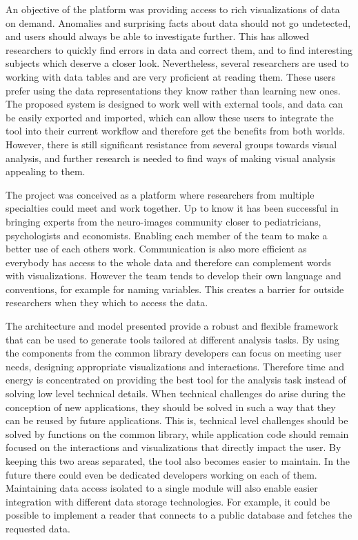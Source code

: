 An objective of the platform was providing access to rich visualizations of data on demand. Anomalies and surprising facts about data should not go undetected, and users should always be able to investigate further. This has allowed researchers to quickly find errors in data and correct them, and to find interesting subjects which deserve a closer look. Nevertheless, several researchers are used to working with data tables and are very proficient at reading them. These users prefer using the data representations they know rather than learning new ones. The proposed system is designed to work well with external tools, and data can be easily exported and imported, which can allow these users to integrate the tool into their current workflow and therefore get the benefits from both worlds. However, there is still significant resistance from several groups towards visual analysis, and further research is needed to find ways of making visual analysis appealing to them. 

The project was conceived as a platform where researchers from multiple specialties could meet and work together. Up to know it has been successful in bringing experts from the neuro-images community closer to pediatricians, psychologists and economists. Enabling each member of the team to make a better use of each others work. Communication is also more efficient as everybody has access to the whole data and therefore can complement words with visualizations. However the team tends to develop their own language and conventions, for example for naming variables. This creates a barrier for outside researchers when they which to access the data. 

The architecture and model presented provide a robust and flexible framework that can be used to generate tools tailored at different analysis tasks. By using the components from the common library developers can focus on meeting user needs, designing appropriate visualizations and interactions. Therefore time and energy is concentrated on providing the best tool for the analysis task instead of solving low level technical details. When technical challenges do arise during the conception of new applications, they should be solved in such a way that they can be reused by future applications. This is, technical level challenges should be solved by functions on the common library, while application code should remain focused on the interactions and visualizations that directly impact the user. By keeping this two areas separated, the tool also becomes easier to maintain. In the future there could even be dedicated developers working on each of them. Maintaining data access isolated to a single module will also enable easier integration with different data storage technologies. For example, it could be possible to implement a reader that connects to a public database and fetches the requested data.


